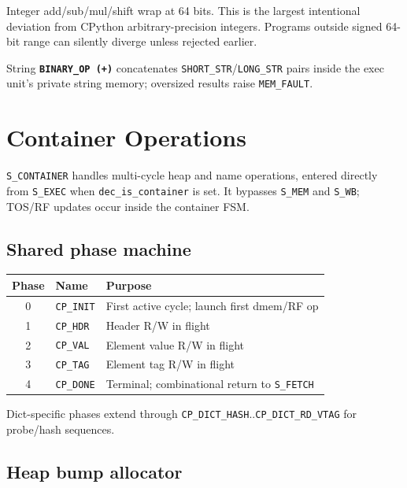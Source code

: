 \documentclass[11pt,a4paper]{article}
\newcommand{\opcode}[1]{\texttt{\textbf{#1}}}
\newcommand{\tagname}[1]{\texttt{#1}}
\begin{document}
\begin{warnbox}
Integer add/sub/mul/shift wrap at 64 bits. This is the largest intentional
deviation from CPython arbitrary-precision integers. Programs outside signed
64-bit range can silently diverge unless rejected earlier.
\end{warnbox}

String \opcode{BINARY\_OP (+)} concatenates \tagname{SHORT\_STR}/\tagname{LONG\_STR}
pairs inside the exec unit's private string memory; oversized results raise
\texttt{MEM\_FAULT}.

\section{Container Operations}
\label{sec:containers}

\texttt{S\_CONTAINER} handles multi-cycle heap and name operations, entered
directly from \texttt{S\_EXEC} when \texttt{dec\_is\_container} is set. It
bypasses \texttt{S\_MEM} and \texttt{S\_WB}; TOS/RF updates occur inside the
container FSM.

\subsection{Shared phase machine}

\begin{center}
\begin{tabular}{@{}clp{8.5cm}@{}}
\toprule
\textbf{Phase} & \textbf{Name} & \textbf{Purpose} \\
\midrule
0 & \texttt{CP\_INIT} & First active cycle; launch first dmem/RF op \\
1 & \texttt{CP\_HDR}  & Header R/W in flight \\
2 & \texttt{CP\_VAL}  & Element value R/W in flight \\
3 & \texttt{CP\_TAG}  & Element tag R/W in flight \\
4 & \texttt{CP\_DONE} & Terminal; combinational return to \texttt{S\_FETCH} \\
\bottomrule
\end{tabular}
\end{center}

Dict-specific phases extend through \texttt{CP\_DICT\_HASH}..\texttt{CP\_DICT\_RD\_VTAG}
for probe/hash sequences.

\subsection{Heap bump allocator}
\end{document}
